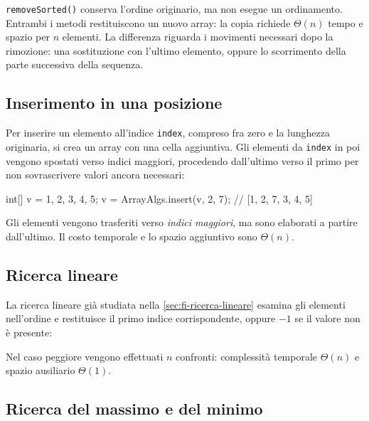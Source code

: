\texttt{removeSorted()} conserva l'ordine originario, ma non
esegue un ordinamento. Entrambi i metodi restituiscono un nuovo
array: la copia richiede \(\Theta(n)\) tempo e spazio per \(n\)
elementi. La differenza riguarda i movimenti necessari dopo la
rimozione: una sostituzione con l'ultimo elemento, oppure lo
scorrimento della parte successiva della sequenza.

\subsection{Inserimento in una posizione}
\label{sec:fi-java-array-insert}

Per inserire un elemento all'indice \texttt{index}, compreso
fra zero e la lunghezza originaria, si crea un array con una
cella aggiuntiva. Gli elementi da \texttt{index} in poi vengono spostati verso
indici maggiori, procedendo dall'ultimo verso il primo per
non sovrascrivere valori ancora necessari:



\begin{unipdcode}[language=Java]
int[] v = {1, 2, 3, 4, 5};
v = ArrayAlgs.insert(v, 2, 7);  // [1, 2, 7, 3, 4, 5]
\end{unipdcode}

Gli elementi vengono trasferiti verso \emph{indici maggiori},
ma sono elaborati a partire dall'ultimo. Il costo temporale
e lo spazio aggiuntivo sono \(\Theta(n)\).

\clearpage

\subsection{Ricerca lineare}
\label{sec:fi-java-array-linear-search}

La ricerca lineare già studiata nella \cref{sec:fi-ricerca-lineare}
esamina gli elementi nell'ordine e restituisce il primo indice
corrispondente, oppure \(-1\) se il valore non è presente:



Nel caso peggiore vengono effettuati \(n\) confronti:
complessità temporale \(\Theta(n)\) e spazio ausiliario
\(\Theta(1)\).

\subsection{Ricerca del massimo e del minimo}
\label{sec:fi-java-array-estremi}

